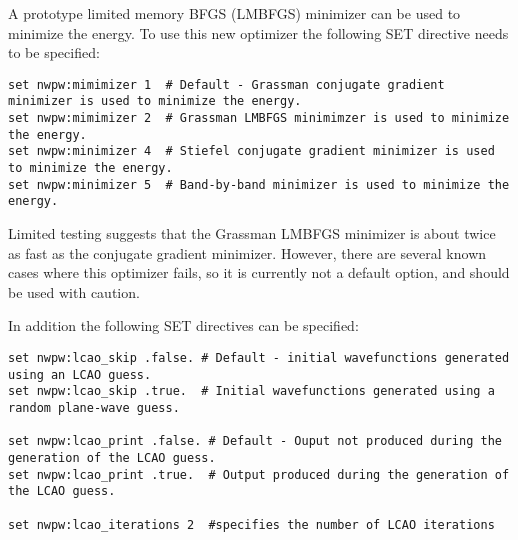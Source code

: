 A prototype limited memory BFGS (LMBFGS) minimizer can be used to minimize the energy.  To
use this new optimizer the following SET directive needs to be specified:
\begin{verbatim}
set nwpw:mimimizer 1  # Default - Grassman conjugate gradient minimizer is used to minimize the energy.
set nwpw:mimimizer 2  # Grassman LMBFGS minimimzer is used to minimize the energy.
set nwpw:minimizer 4  # Stiefel conjugate gradient minimizer is used to minimize the energy. 
set nwpw:minimizer 5  # Band-by-band minimizer is used to minimize the energy.
\end{verbatim}
Limited testing suggests that the Grassman LMBFGS minimizer is about twice as fast as
the conjugate gradient minimizer.  However, there are several known cases
where this optimizer fails, so it is currently not a default option, and
should be used with caution.

In addition the following SET directives can be specified:
\begin{verbatim}
set nwpw:lcao_skip .false. # Default - initial wavefunctions generated using an LCAO guess. 
set nwpw:lcao_skip .true.  # Initial wavefunctions generated using a random plane-wave guess.

set nwpw:lcao_print .false. # Default - Ouput not produced during the generation of the LCAO guess. 
set nwpw:lcao_print .true.  # Output produced during the generation of the LCAO guess.

set nwpw:lcao_iterations 2  #specifies the number of LCAO iterations 
\end{verbatim}


